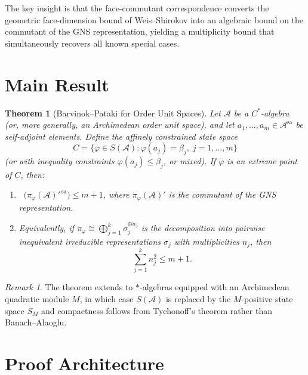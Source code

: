 \documentclass[11pt,a4paper]{article}
\theoremstyle{plain}
\newtheorem{theorem}{Theorem}[section]
\theoremstyle{definition}
\theoremstyle{remark}
\newtheorem*{remark*}{Remark}
\newcommand{\R}{\mathbb{R}}
\newcommand{\sa}{\mathrm{sa}}
\DeclareMathOperator{\dimR}{dim_{\R}}
\begin{document}
The key insight is that the face-commutant correspondence converts the
geometric face-dimension bound of Weis--Shirokov into an algebraic bound
on the commutant of the GNS representation, yielding a multiplicity bound
that simultaneously recovers all known special cases.


\section{Main Result}
\label{sec:main-result}

\begin{theorem}[Barvinok--Pataki for Order Unit Spaces]
\label{thm:main}
Let $\mathcal{A}$ be a $C^*$-algebra (or, more generally, an Archimedean
order unit space), and let $a_1, \ldots, a_m \in \mathcal{A}^{\sa}$ be
self-adjoint elements. Define the affinely constrained state space
\[
  C = \bigl\{\varphi \in S(\mathcal{A}) : \varphi(a_j) = \beta_j,\;
  j = 1, \ldots, m\bigr\}
\]
(or with inequality constraints $\varphi(a_j) \le \beta_j$, or mixed).
If $\varphi$ is an extreme point of $C$, then:
\begin{enumerate}[label=(\Roman*)]
  \item $\dimR\bigl(\pi_\varphi(\mathcal{A})'^{\,\sa}\bigr) \le m + 1$,
        where $\pi_\varphi(\mathcal{A})'$ is the commutant of the GNS
        representation.
  \item Equivalently, if
        $\pi_\varphi \cong \bigoplus_{j=1}^k \sigma_j^{\oplus n_j}$
        is the decomposition into pairwise inequivalent irreducible
        representations $\sigma_j$ with multiplicities $n_j$, then
        \[
          \sum_{j=1}^k n_j^2 \le m + 1.
        \]
\end{enumerate}
\end{theorem}

\begin{remark*}
The theorem extends to $*$-algebras equipped with an Archimedean quadratic
module $M$, in which case $S(\mathcal{A})$ is replaced by the
$M$-positive state space $S_M$ and compactness follows from Tychonoff's
theorem rather than Banach--Alaoglu.
\end{remark*}


\section{Proof Architecture}
\label{sec:proof-architecture}
\end{document}
